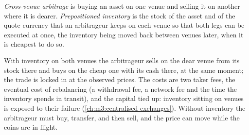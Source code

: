 \begin{omfigure}
\centering
{}

\label{fig:m3:spot-markets:triangle}
\end{omfigure}

\begin{definition}\label{def:m3:spot-markets:cross}
\emph{Cross-venue arbitrage} is buying an asset on one venue and selling it on
another where it is dearer. \emph{Prepositioned inventory} is the stock of
the asset and of the quote currency that an arbitrageur keeps on each venue so that both legs can be
executed at once, the inventory being moved back between venues later, when it is cheapest to do so.
\end{definition}

With inventory on both venues the arbitrageur sells on the dear venue from its stock there and buys on the
cheap one with its cash there, at the same moment; the trade is locked in at the observed prices. The costs
are two taker fees, the eventual cost of rebalancing (a withdrawal fee, a network fee and the time the
inventory spends in transit), and the capital tied up: inventory sitting on venues is exposed to their
failure (\cref{ch:m3:centralised-exchanges}). Without inventory the arbitrageur must buy, transfer, and then
sell, and the price can move while the coins are in flight.


